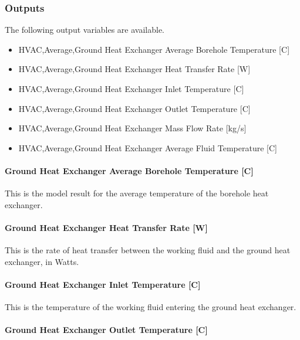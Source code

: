 \subsubsection{Outputs}\label{outputs-11-000}

The following output variables are available.

\begin{itemize}
\item
  HVAC,Average,Ground Heat Exchanger Average Borehole Temperature {[}C{]}
\item
  HVAC,Average,Ground Heat Exchanger Heat Transfer Rate {[}W{]}
\item
  HVAC,Average,Ground Heat Exchanger Inlet Temperature {[}C{]}
\item
  HVAC,Average,Ground Heat Exchanger Outlet Temperature {[}C{]}
\item
  HVAC,Average,Ground Heat Exchanger Mass Flow Rate {[}kg/s{]}
\item
  HVAC,Average,Ground Heat Exchanger Average Fluid Temperature {[}C{]}
\end{itemize}

\paragraph{Ground Heat Exchanger Average Borehole Temperature {[}C{]}}\label{ground-heat-exchanger-average-borehole-temperature-c-1}

This is the model result for the average temperature of the borehole heat exchanger.

\paragraph{Ground Heat Exchanger Heat Transfer Rate {[}W{]}}\label{ground-heat-exchanger-heat-transfer-rate-w-1}

This is the rate of heat transfer between the working fluid and the ground heat exchanger, in Watts.

\paragraph{Ground Heat Exchanger Inlet Temperature {[}C{]}}\label{ground-heat-exchanger-inlet-temperature-c-1}

This is the temperature of the working fluid entering the ground heat exchanger.

\paragraph{Ground Heat Exchanger Outlet Temperature {[}C{]}}\label{ground-heat-exchanger-outlet-temperature-c-1}

